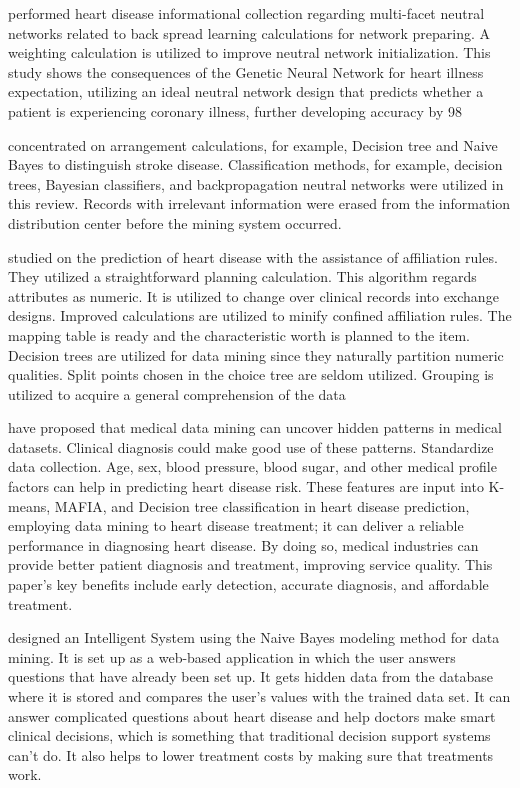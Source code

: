 {\citealp{waghulde2014genetic} performed heart disease informational collection regarding multi-facet neutral networks related to back spread learning calculations for network preparing. A weighting calculation is utilized to improve neutral network initialization. This study shows the consequences of the Genetic Neural Network for heart illness expectation, utilizing an ideal neutral network design that predicts whether a patient is experiencing coronary illness, further developing accuracy by 98%

\citealp{sudha2012effective} concentrated on arrangement calculations, for example, Decision tree and Naive Bayes to distinguish stroke disease. Classification methods, for example, decision trees, Bayesian classifiers, and backpropagation neutral networks were utilized in this review. Records with irrelevant information were erased from the information distribution center before the mining system occurred.

\citealp{ordonez2001mining} studied on the prediction of heart disease with the assistance of affiliation rules. They utilized a straightforward planning calculation. This algorithm regards attributes as numeric. It is utilized to change over clinical records into exchange designs. Improved calculations are utilized to minify confined affiliation rules. The mapping table is ready and the characteristic worth is planned to the item. Decision trees are utilized for data mining since they naturally partition numeric qualities. Split points chosen in the choice tree are seldom utilized. Grouping is utilized to acquire a general comprehension of the data


\citealp{babu2017heart}  have proposed that medical data mining can uncover hidden patterns in medical datasets. Clinical diagnosis could make good use of these patterns. Standardize data collection. Age, sex, blood pressure, blood sugar, and other medical profile factors can help in predicting heart disease risk. These features are input into K-means, MAFIA, and Decision tree classification in heart disease prediction, employing data mining to heart disease treatment; it can deliver a reliable performance in diagnosing heart disease. By doing so, medical industries can provide better patient diagnosis and treatment, improving service quality. This paper's key benefits include early detection, accurate diagnosis, and affordable treatment.


\citealp{pattekari2012prediction} designed an Intelligent System using the Naive Bayes modeling method for data mining. It is set up as a web-based application in which the user answers questions that have already been set up. It gets hidden data from the database where it is stored and compares the user's values with the trained data set. It can answer complicated questions about heart disease and help doctors make smart clinical decisions, which is something that traditional decision support systems can't do. It also helps to lower treatment costs by making sure that treatments work.

}
